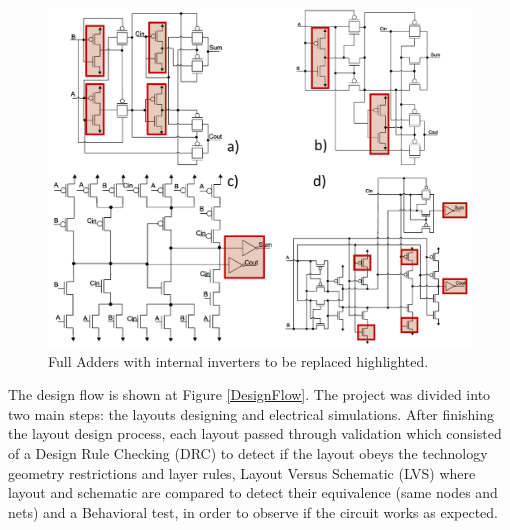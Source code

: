 \documentclass[pgmicro,mestrado,english]{iiufrgs}
\begin{document}
\begin{figure}[]
\centering
\includegraphics[width=1\textwidth]{FAs.png}
\caption{Full Adders with internal inverters to be replaced highlighted.}
\label{fig:FAs}
\end{figure}

The design flow is shown at Figure \ref{DesignFlow}. The project was divided into two main steps: the layouts designing and electrical simulations. After finishing the layout design process, each layout passed through validation which consisted of a Design Rule Checking (DRC) to detect if the layout obeys the technology geometry restrictions and layer rules, Layout Versus Schematic (LVS) where layout and schematic are compared to detect their equivalence (same nodes and nets) and a Behavioral test, in order to observe if the circuit works as expected. 
\end{document}
